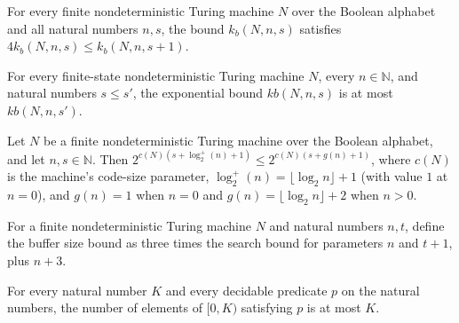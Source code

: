 \begin{lemma}
\label{Complexity.LogProg.ExpBFS.four_mul_kb_le}
\leanok
{}
For every finite nondeterministic Turing machine $N$ over the Boolean alphabet and all
natural numbers $n,s$, the bound $k_b(N,n,s)$ satisfies $4k_b(N,n,s)\le k_b(N,n,s+1)$.
\end{lemma}

\begin{lemma}
\label{Complexity.LogProg.ExpBFS.kb_mono}
\leanok
{}
For every finite-state nondeterministic Turing machine $N$, every $n\in\mathbb{N}$, and
natural numbers $s\le s'$, the exponential bound $kb(N,n,s)$ is at most $kb(N,n,s')$.
\end{lemma}

\begin{lemma}
\label{Complexity.LogProg.ExpBFS.code_bound_le}
\leanok
{}
Let $N$ be a finite nondeterministic Turing machine over the Boolean alphabet, and let
$n,s\in\mathbb{N}$. Then $2^{c(N)(s+\log_2^+(n)+1)}\leq 2^{c(N)(s+g(n)+1)}$, where
$c(N)$ is the machine’s code-size parameter, $\log_2^+(n)=\lfloor\log_2 n\rfloor+1$
(with value $1$ at $n=0$), and $g(n)=1$ when $n=0$ and $g(n)=\lfloor\log_2 n\rfloor+2$
when $n>0$.
\end{lemma}

\begin{definition}
\label{Complexity.LogProg.ExpBFS.bigB}
\leanok
{}
For a finite nondeterministic Turing machine $N$ and natural numbers $n,t$, define the
buffer size bound as three times the search bound for parameters $n$ and $t+1$, plus
$n+3$.
\end{definition}

\begin{lemma}
\label{Complexity.LogProg.ExpBFS.card_filter_range_le}
\leanok
{}
For every natural number $K$ and every decidable predicate $p$ on the natural numbers,
the number of elements of $[0,K)$ satisfying $p$ is at most $K$.
\end{lemma}

